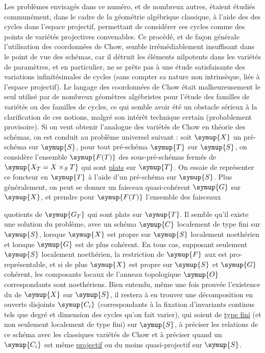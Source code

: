  Les problèmes envisagés dans ce numéro, et de nombreux
autres, étaient étudiés communément, dans le cadre de la géométrie algébrique
classique, à l'aide des  des cycles dans l'espace
projectif, permettant de considérer ces cycles comme des points de variétés
projectives convenables. Ce procédé, et de façon générale l'utilisation des
coordonnées de Chow, semble irrémédiablement insuffisant dans le point de vue
des schémas, car il détruit les éléments nilpotents dans les variétés de
paramètres, et en particulier, ne se prête pas à une étude satisfaisante des
variations infinitésimales de cycles (sans compter sa nature non intrinsèque,
liée à l'espace projectif). Le langage des coordonnées de Chow était
malheureusement le seul utilisé par de nombreux géomètres algébristes pour
l'étude des familles de variétés ou des familles de cycles, ce qui semble
avoir été un obstacle sérieux à la clarification de ces notions, malgré son
intérêt technique certain (probablement provisoire). Si on veut obtenir
l'analogue des variétés de Chow en théorie des schémas, on est conduit au
problème universel suivant : soit $\symup{X}$ un pré-schéma sur $\symup{S}$, pour tout
pré-schéma $\symup{T}$ sur $\symup{S}$, on considère l'ensemble $\symup{F(T)}$ des sous-pré-schémas
fermés de $\symup{X_T=X\times_ST}$ qui sont \uline{plats} sur $\symup{T}$. On essaie de représenter ce
foncteur en $\symup{T}$ à l'aide d'un pré-schéma sur $\symup{S}$. Plus généralement, on peut se
donner un faisceau quasi-cohérent $\symup{G}$ sur $\symup{X}$, et prendre pour $\symup{F(T)}$
l'ensemble des faisceaux

quotients de $\symup{G_T}$ qui sont plats sur $\symup{T}$. Il semble qu'il existe une solution
du problème, avec un schéma $\symup{C}$ localement de type fini sur $\symup{S}$, lorsque $\symup{X}$
est propre sur $\symup{S}$ localement noethérien et lorsque $\symup{G}$ est de plus cohérent.
En tous cas, supposant seulement $\symup{S}$ localement noethérien, la restriction de
$\symup{F}$ aux  est pro-représentable, et si de plus $\symup{X}$
est propre sur $\symup{S}$ et $\symup{G}$ cohérent, les composants locaux de l'anneau
topologique $\symup{O}$ correspondants sont noethériens. Bien entendu, même une fois
prouvée l'existence du  de $\symup{X}$ sur $\symup{S}$, il restera à en
trouver une décomposition en ouverts disjoints $\symup{C_i}$ (correspondants à la
fixation d'invariants continus tels que degré et dimension des cycles qu'on
fait varier), qui soient de \uline{type fini} (et non seulement localement de type
fini) sur $\symup{S}$, à préciser les relations de ce schéma avec les classiques
variétés de Chow et à préciser quand un $\symup{C_i}$ est même \uline{projectif} ou du moins
quasi-projectif sur $\symup{S}$.

